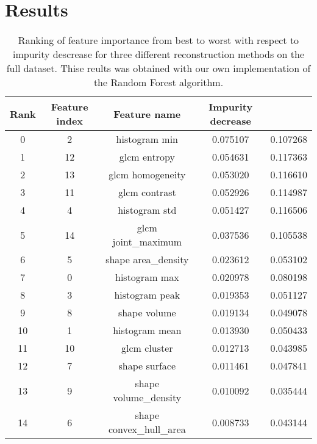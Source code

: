 \section{Results}


\begin{table}
    \centering
    \centering
    \caption{Ranking of feature importance from best to worst with respect to
    impurity descrease for three different reconstruction methods on the full
    dataset. Thise reults was obtained with our own implementation of the
Random Forest algorithm. }  
    \label{tab:feature_importance_own}  

    \begin{tabular}{|c|c|c|c|c|}
        \hline
        Rank & Feature index & Feature name & Impurity decrease \\     
        \hline
            0       & 2           & histogram min  & 0.075107  & 0.107268 \\
            1      & 12            & glcm entropy  & 0.054631  & 0.117363 \\
            2      & 13        & glcm homogeneity  & 0.053020  & 0.116610 \\
            3      & 11           & glcm contrast  & 0.052926  & 0.114987 \\
            4       & 4           & histogram std  & 0.051427  & 0.116506 \\
            5      & 14      & glcm joint\_maximum  & 0.037536  & 0.105538 \\
            6       & 5      & shape area\_density  & 0.023612  & 0.053102 \\
            7       & 0           & histogram max  & 0.020978  & 0.080198 \\
            8       & 3          & histogram peak  & 0.019353  & 0.051127 \\
            9       & 8            & shape volume  & 0.019134  & 0.049078 \\
            10      & 1          & histogram mean  & 0.013930  & 0.050433 \\
            11     & 10            & glcm cluster  & 0.012713  & 0.043985 \\
            12      & 7           & shape surface  & 0.011461  & 0.047841 \\
            13      & 9    & shape volume\_density  & 0.010092  & 0.035444 \\
            14      & 6  & shape convex\_hull\_area  & 0.008733  & 0.043144 \\
        \hline
         
    \end{tabular} 
\end{table}



